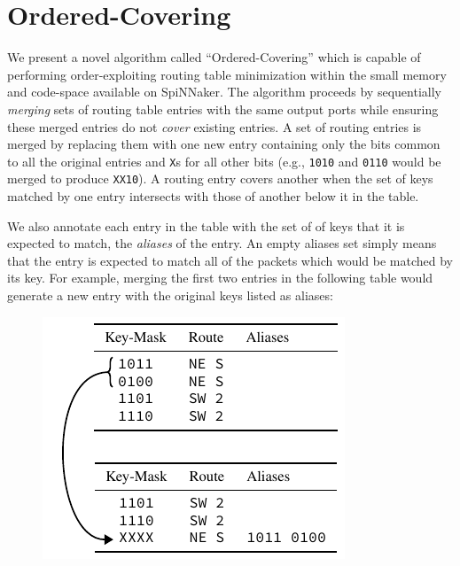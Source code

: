 \documentclass[conference]{IEEEtran}
\newcommand{\mytt}[1]{\texttt{\footnotesize#1}}
\begin{document}
\section{Ordered-Covering}

  We present a novel algorithm called ``Ordered-Covering'' which is capable of performing order-exploiting routing table minimization within the small memory and code-space available on SpiNNaker.
  The algorithm proceeds by sequentially \textit{merging} sets of routing table entries with the same output ports while ensuring these merged entries do not \textit{cover} existing entries. 
  A set of routing entries is merged by replacing them with one new entry containing only the bits common to all the original entries and \mytt{X}s for all other bits
  (e.g., \mytt{1010} and \mytt{0110} would be merged to produce \mytt{XX10}).
  A routing entry covers another when the set of keys matched by one entry intersects with those of another below it in the table.

  We also annotate each entry in the table with the set of of keys that it is expected to match, the \textit{aliases} of the entry.
  An empty aliases set simply means that the entry is expected to match all of the packets which would be matched by its key.
  For example, merging the first two entries in the following table would generate a new entry with the original keys listed as aliases:

  \begin{figure}[H]
    \centering
    \includegraphics{figures/aliases_example}
  \end{figure}
\end{document}
